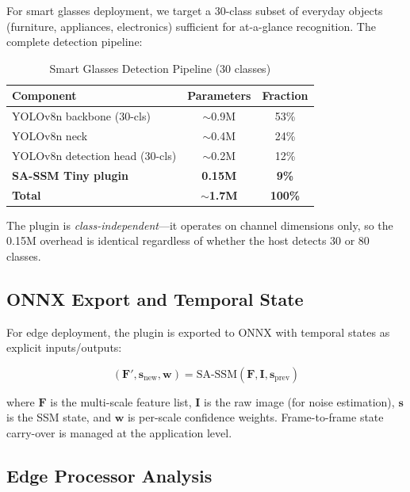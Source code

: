 \documentclass[conference]{IEEEtran}
\begin{document}
For smart glasses deployment, we target a 30-class subset of everyday objects (furniture, appliances, electronics) sufficient for at-a-glance recognition. The complete detection pipeline:

\begin{table}[t]
\centering
\caption{Smart Glasses Detection Pipeline (30 classes)}
\label{tab:smartglass}
\small
\begin{tabular}{@{}lcc@{}}
\toprule
Component & Parameters & Fraction \\
\midrule
YOLOv8n backbone (30-cls) & $\sim$0.9M & 53\% \\
YOLOv8n neck & $\sim$0.4M & 24\% \\
YOLOv8n detection head (30-cls) & $\sim$0.2M & 12\% \\
\textbf{SA-SSM Tiny plugin} & \textbf{0.15M} & \textbf{9\%} \\
\midrule
\textbf{Total} & $\mathbf{\sim}$\textbf{1.7M} & \textbf{100\%} \\
\bottomrule
\end{tabular}
\end{table}

The plugin is \emph{class-independent}---it operates on channel dimensions only, so the 0.15M overhead is identical regardless of whether the host detects 30 or 80 classes.

\subsection{ONNX Export and Temporal State}

For edge deployment, the plugin is exported to ONNX with temporal states as explicit inputs/outputs:

\begin{equation}
(\mathbf{F}', \mathbf{s}_{\text{new}}, \mathbf{w}) = \text{SA-SSM}(\mathbf{F}, \mathbf{I}, \mathbf{s}_{\text{prev}})
\end{equation}

where $\mathbf{F}$ is the multi-scale feature list, $\mathbf{I}$ is the raw image (for noise estimation), $\mathbf{s}$ is the SSM state, and $\mathbf{w}$ is per-scale confidence weights. Frame-to-frame state carry-over is managed at the application level.

\subsection{Edge Processor Analysis}
\end{document}
